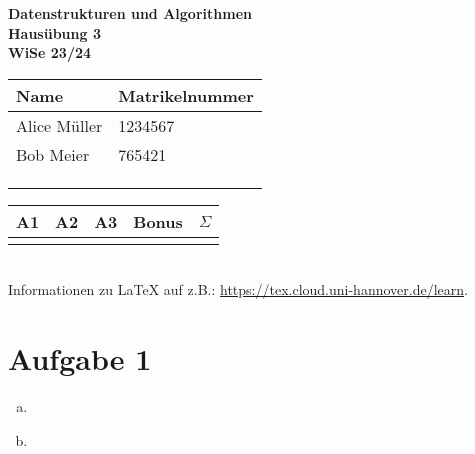 \documentclass[a4paper,12pt]{scrartcl}
\def\Nr{3}					%
\def\NameA{Alice Müller}	%
\def\MatA{1234567}			%
\def\NameB{Bob Meier}		%
\def\MatB{765421}			%
\def\NameC{}				%
\def\MatC{}					%
\def\NameD{}				%
\def\MatD{}					%
\begin{document}
\begin{center}
	\sffamily
	\bfseries
	\LARGE
	Datenstrukturen und Algorithmen\\
	\Large
	\vspace{.2\parskip}
	Hausübung \Nr\\
	\normalsize\normalfont
	WiSe 23/24
	\vspace{.2\parskip}
\end{center}

\begin{tabular}[t]{p{4.5cm} p{3cm}}
	\toprule
	Name & Matrikelnummer\\
	\midrule
	\NameA & \MatA\\
	\NameB & \MatB\\
	\ifx\NameC\empty\else\NameC & \MatC\\\fi
	\ifx\NameD\empty\else\NameD & \MatD\\\fi
	\bottomrule
\end{tabular}
\hfill
\begin{tabular}[t]{ccccc}
	\toprule
	A1 & A2 & A3 & Bonus & $\Sigma$ \\
	\midrule
	\\
	\bottomrule	
\end{tabular}
\hfill\\


Informationen zu \LaTeX{} auf z.B.: \url{https://tex.cloud.uni-hannover.de/learn}.

\section*{Aufgabe 1}
\begin{enumerate}[a)]
	\item
    \item \
    \begin{center}
        \end{center}
\end{enumerate}
\end{document}
